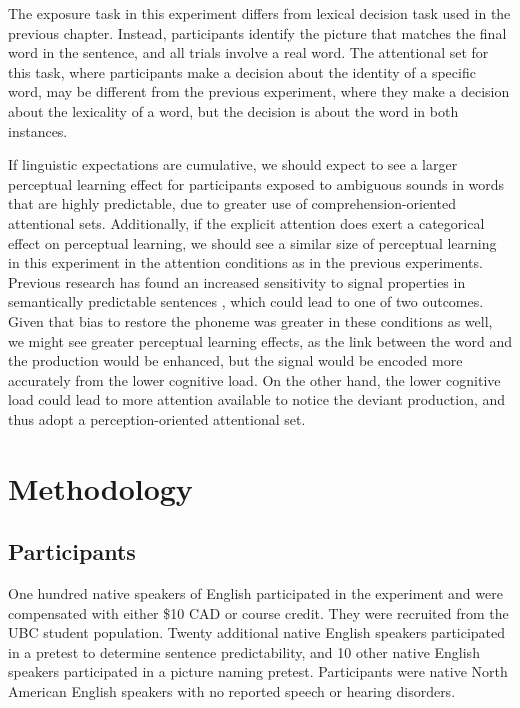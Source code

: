 The exposure task in this experiment differs from lexical decision task used in the previous chapter.  
Instead, participants identify the picture that matches the final word in the sentence, and all trials involve a real word.
The attentional set for this task, where participants make a decision about the identity of a specific word, may be different from the previous experiment, where they make a decision about the lexicality of a word, but the decision is about the word in both instances.

If linguistic expectations are cumulative, we should expect to see a larger perceptual learning effect for participants exposed to ambiguous sounds in words that are highly predictable, due to greater use of comprehension-oriented attentional sets.
Additionally, if the explicit attention does exert a categorical effect on perceptual learning, we should see a similar size of perceptual learning in this experiment in the attention conditions as in the previous experiments.
Previous research has found an increased sensitivity to signal properties in semantically predictable sentences \citep{Samuel1981}, which could lead to one of two outcomes.
Given that bias to restore the phoneme was greater in these conditions as well, we might see greater perceptual learning effects, as the link between the word and the production would be enhanced, but the signal would be encoded more accurately from the lower cognitive load.
On the other hand, the lower cognitive load could lead to more attention available to notice the deviant production, and thus adopt a perception-oriented attentional set.

\section{Methodology}

\subsection{Participants}

One hundred native speakers of English participated in the experiment and were compensated with either \$10 CAD or course credit. 
They were recruited from the UBC student population.  
Twenty additional native English speakers participated in a pretest to determine sentence predictability, and 10 other native English speakers participated in a picture naming pretest.
Participants were native North American English speakers with no reported speech or hearing disorders.

